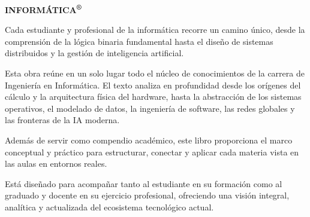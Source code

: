 \documentclass[11pt, oneside]{book}
\begin{document}
\begin{minipage}[t]{0.31\textwidth}
    \vspace{0pt}
    {\raggedleft \fontsize{15}{17}\selectfont\bfseries\color{cPart1} INFORMÁTICA\textsuperscript{\scriptsize®} \par}
    \vspace{0.6cm}

    {\doublespacing\fontsize{9}{11}\selectfont\color{cPart3}\raggedright
    Cada estudiante y profesional de la informática recorre un camino único, desde la comprensión de la lógica binaria fundamental hasta el diseño de sistemas distribuidos y la gestión de inteligencia artificial.

    \vspace{0.4cm}
    Esta obra reúne en un solo lugar todo el núcleo de conocimientos de la carrera de Ingeniería en Informática. El texto analiza en profundidad desde los orígenes del cálculo y la arquitectura física del hardware, hasta la abstracción de los sistemas operativos, el modelado de datos, la ingeniería de software, las redes globales y las fronteras de la IA moderna.

    \vspace{0.4cm}
    Además de servir como compendio académico, este libro proporciona el marco conceptual y práctico para estructurar, conectar y aplicar cada materia vista en las aulas en entornos reales.

    \vspace{0.4cm}
    Está diseñado para acompañar tanto al estudiante en su formación como al graduado y docente en su ejercicio profesional, ofreciendo una visión integral, analítica y actualizada del ecosistema tecnológico actual.\par}
\end{minipage}

\restoregeometry
\clearpage

\activarMenuLateral

\end{document}

